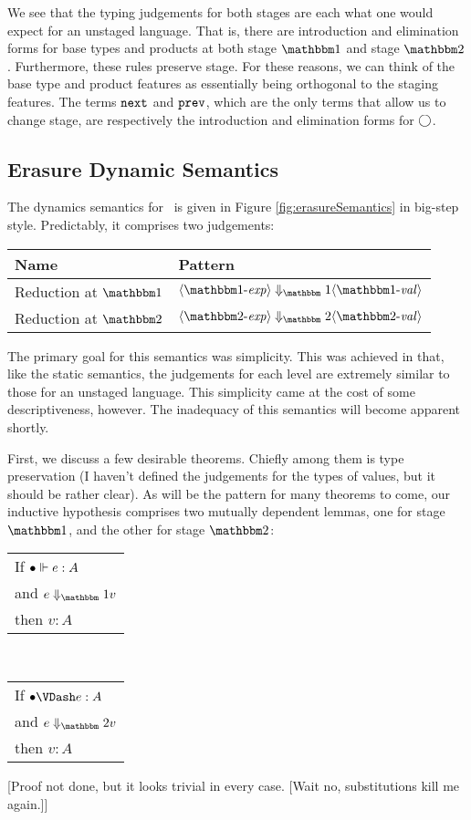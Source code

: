 \documentclass{article}
\begin{document}
We see that the typing judgements for both stages are each what one would expect for an unstaged language.  That is, there are introduction and elimination forms for base types and products at both stage $\bbone$ and stage $\bbtwo$.  Furthermore, these rules preserve stage.  For these reasons, we can think of the base type and product features as essentially being orthogonal to the staging features.  The terms $\next$ and $\prev$, which are the only terms that allow us to change stage, are respectively the introduction and elimination forms for $\fut$.


\subsection{Erasure Dynamic Semantics}

The dynamics semantics for \ellStaged~is given in Figure \ref{fig:erasureSemantics} in big-step style.  Predictably, it comprises two judgements:

\begin{center}
\begin{tabular}{|l|l|} \hline
Name & Pattern \\ \hline
Reduction at $\bbone$ & $\reduceone{\expro}{\valo}$ \\  \hline
Reduction at $\bbtwo$ & $\reducetwo{\exprt}{\valt}$ \\ \hline
\end{tabular}
\end{center}

The primary goal for this semantics was simplicity.  This was achieved in that, like the static semantics, the judgements for each level are extremely similar to those for an unstaged language.  This simplicity came at the cost of some descriptiveness, however.  The inadequacy of this semantics will become apparent shortly.

First, we discuss a few desirable theorems.  Chiefly among them is type preservation (I haven't defined the judgements for the types of values, but it should be rather clear).  As will be the pattern for many theorems to come, our inductive hypothesis comprises two mutually dependent lemmas, one for stage $\bbone$, and the other for stage $\bbtwo$:
\begin{center}
\begin{tabular}{l}
If $\typesone [\emptyC]{e}{A}$ \\
and $\reduceone{e}{v}$ \\
then $v : A$
\end{tabular}
~~~
\begin{tabular}{l}
If $\typestwo [\emptyC]{e}{A}$ \\
and $\reducetwo{e}{v}$ \\
then $v : A$
\end{tabular}
\end{center}
[Proof not done, but it looks trivial in every case. [Wait no, substitutions kill me again.]]
\end{document}
